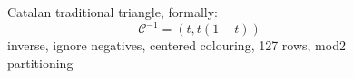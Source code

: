 
\begin{figure}[p]

    \noindent{}

    \captionsetup{singlelinecheck=off}
    \caption[$\mathcal{C}_{\equiv_{2}}^{-1}$]{
        Catalan traditional triangle, formally: 
        \begin{displaymath}
            \mathcal{C}^{-1}=\left(t, t {\left(1-t\right)} \right)
        \end{displaymath} %
        inverse, ignore negatives, centered colouring, 127 rows, mod2 partitioning
        }

    \label{fig:catalan-traditional-inverse-ignore-negatives-centered-colouring-127-rows-mod2-partitioning-triangle}

\end{figure}
